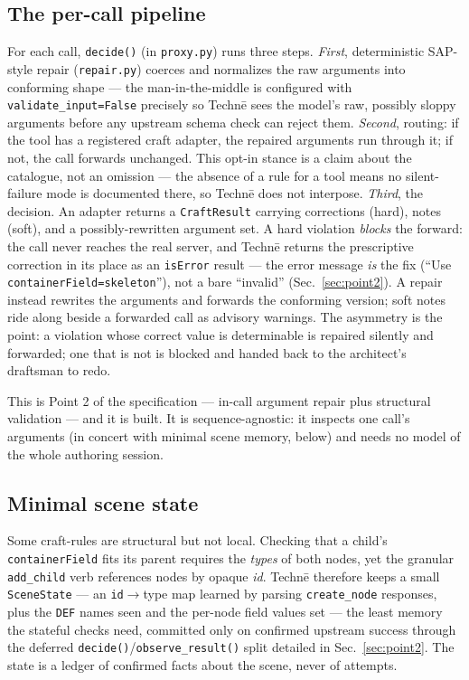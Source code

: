 \documentclass[sigconf,nonacm,screen,anonymous]{acmart}
\begin{document}
\subsection{The per-call pipeline}

For each call, \texttt{decide()} (in \texttt{proxy.py}) runs three steps. \emph{First}, deterministic SAP-style repair (\texttt{repair.py}) coerces and normalizes the raw arguments into conforming shape --- the man-in-the-middle is configured with \texttt{validate\_input=False} precisely so Technē sees the model's raw, possibly sloppy arguments before any upstream schema check can reject them. \emph{Second}, routing: if the tool has a registered craft adapter, the repaired arguments run through it; if not, the call forwards unchanged. This opt-in stance is a claim about the catalogue, not an omission --- the absence of a rule for a tool means no silent-failure mode is documented there, so Technē does not interpose. \emph{Third}, the decision. An adapter returns a \texttt{CraftResult} carrying corrections (hard), notes (soft), and a possibly-rewritten argument set. A hard violation \emph{blocks} the forward: the call never reaches the real server, and Technē returns the prescriptive correction in its place as an \texttt{isError} result --- the error message \emph{is} the fix (``Use \texttt{containerField=\textquotesingle{}skeleton\textquotesingle{}}''), not a bare ``invalid'' (Sec.~\ref{sec:point2}). A repair instead rewrites the arguments and forwards the conforming version; soft notes ride along beside a forwarded call as advisory warnings. The asymmetry is the point: a violation whose correct value is determinable is repaired silently and forwarded; one that is not is blocked and handed back to the architect's draftsman to redo.

This is Point 2 of the specification --- in-call argument repair plus structural validation --- and it is built. It is sequence-agnostic: it inspects one call's arguments (in concert with minimal scene memory, below) and needs no model of the whole authoring session.

\subsection{Minimal scene state}

Some craft-rules are structural but not local. Checking that a child's \texttt{containerField} fits its parent requires the \emph{types} of both nodes, yet the granular \texttt{add\_child} verb references nodes by opaque \emph{id}. Technē therefore keeps a small \texttt{SceneState} --- an \texttt{id}$\rightarrow$type map learned by parsing \texttt{create\_node} responses, plus the \texttt{DEF} names seen and the per-node field values set --- the least memory the stateful checks need, committed only on confirmed upstream success through the deferred \texttt{decide()}/\texttt{observe\_result()} split detailed in Sec.~\ref{sec:point2}. The state is a ledger of confirmed facts about the scene, never of attempts.
\end{document}
